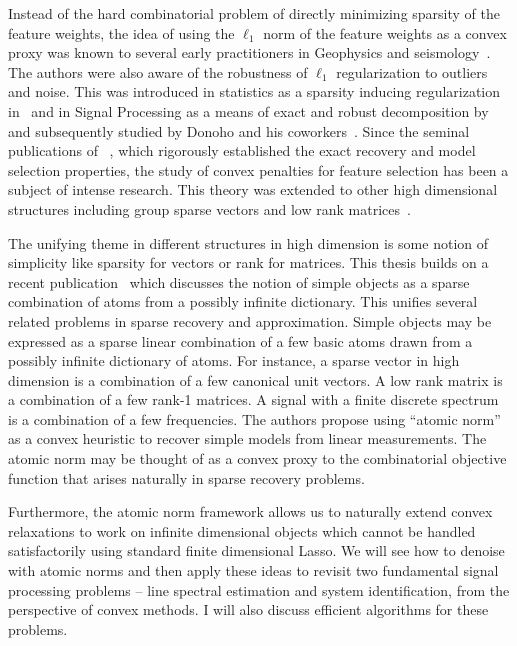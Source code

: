 Instead of the hard combinatorial problem of directly minimizing sparsity of the
feature weights, the idea of using the $\ell_1$ norm of the feature weights as a
convex proxy was known to several early practitioners in Geophysics and
seismology~\cite{claerbout:robust,taylor:deconvolution,levy:spike-train,santosa}.
The authors were also aware of the robustness of $\ell_1$ regularization to
outliers and noise. This was introduced in statistics as a sparsity inducing
regularization in~\cite{tibshirani96} and in Signal Processing as a means of
exact and robust decomposition by~\cite{chen98} and subsequently studied by
Donoho and his coworkers~\cite{donoho:huo,spark}. Since the seminal publications
of ~\cite{CRT06,meinshausen:variable-selection}, which rigorously established
the exact recovery and model selection properties, the study of convex penalties
for feature selection has been a subject of intense research. This theory was
extended to other high dimensional structures including group sparse
vectors\cite{group:lasso} and low rank matrices~\cite{Recht10}.



The unifying theme in different structures in high dimension is some notion of
simplicity like sparsity for vectors or rank for matrices. This thesis builds on
a recent publication~\cite{crpw} which discusses the notion of simple objects as
a sparse combination of atoms from a possibly infinite dictionary. This unifies
several related problems in sparse recovery and approximation. Simple objects
may be expressed as a sparse linear combination of a few basic atoms drawn from
a possibly infinite dictionary of atoms. For instance, a sparse vector in high
dimension is a combination of a few canonical unit vectors. A low rank matrix is
a combination of a few rank-1 matrices. A signal with a finite discrete spectrum
is a combination of a few frequencies. The authors propose using ``atomic norm''
as a convex heuristic to recover simple models from linear measurements. The
atomic norm may be thought of as a convex proxy to the combinatorial objective
function that arises naturally in sparse recovery problems.

Furthermore, the atomic norm framework allows us to naturally extend convex
relaxations to work on infinite dimensional objects which cannot be handled
satisfactorily using standard finite dimensional Lasso. We will see how to
denoise with atomic norms and then apply these ideas to revisit two fundamental
signal processing problems -- line spectral estimation and system
identification, from the perspective of convex methods. I will also discuss
efficient algorithms for these problems.

